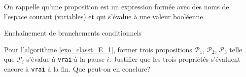 On rappelle qu'une proposition est un expression formée avec des noms de l'espace courant (variables) et qui s'évalue à une valeur booléenne.

\begin{algorithm}
  \caption{Enchaînement de branchements conditionnels}
  \label{exo_classt_E_1}
\end{algorithm}
Pour l'algorithme \ref{exo_classt_E_1}, former trois propositions $\mathcal{P}_1$, $\mathcal{P}_2$, $\mathcal{P}_3$ telle que $\mathcal{P}_i$ s'évalue à \verb|vrai| à la pause $i$. Justifier que les trois propriétés s'évaluent encore à \verb|vrai| à la fin. Que peut-on en conclure?   